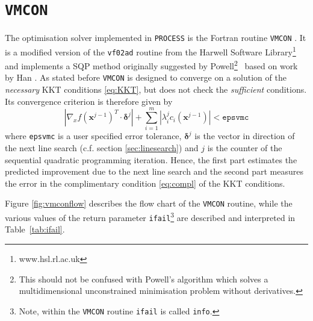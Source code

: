 \documentclass[11pt,a4paper]{report}
\newcommand{\ifail}{\mbox{\texttt{ifail}}}
\newcommand{\process}{\mbox{\texttt{PROCESS}}}
\newcommand{\vmcon}{\mbox{\texttt{VMCON}}}
\renewcommand{\vec}[1]{\boldsymbol{#1}}
\begin{document}
\section{\vmcon}
\label{sec:vmcon}
The optimisation solver implemented in \process\/ is the Fortran routine
\vmcon\/ \cite{vmcon}. It is a modified version of the \texttt{vf02ad} routine
from the Harwell Software Library\footnote{www.hsl.rl.ac.uk} and implements a
SQP method originally suggested by Powell\footnote{This should not be confused
  with Powell's algorithm \cite{Powell1964} which solves a multidimensional
  unconstrained minimisation problem without derivatives.}~\cite{Powell1978}
based on work by Han \cite{Han1975}.  As stated before \vmcon\/ is designed to
converge on a solution of the {\it necessary} KKT conditions \ref{eq:KKT}, but
does not check the {\it sufficient} conditions. Its convergence criterion is
therefore given by
\begin{equation}
\label{eq:vmcon_errtol}
\left| \nabla_x f(\vec{x}^{j-1})^T \cdot \vec{\delta}^{j} \right| +
\sum^m_{i=1}\left| \lambda^j_i c_i(\vec{x}^{j-1}) \right| < \texttt{epsvmc}
\end{equation} %
where \texttt{epsvmc} is a user specified error tolerance, $\vec{\delta}^j$ is
the vector in direction of the next line search (c.f. section
\ref{sec:linesearch}) and $j$ is the counter of the sequential quadratic
programming iteration. Hence, the first part estimates the predicted
improvement due to the next line search and the second part measures the error
in the complimentary condition \ref{eq:compl} of the KKT conditions.

Figure \ref{fig:vmconflow} describes the flow chart of the \vmcon\/ routine,
while the various values of the return parameter \ifail\/\footnote{Note,
  within the \vmcon\/ routine \ifail\/ is called \texttt{info}.} are described
and interpreted in Table~\ref{tab:ifail}.
\end{document}
